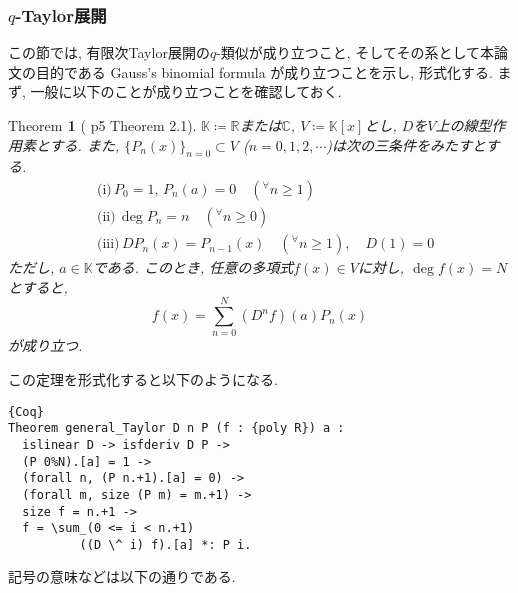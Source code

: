 \documentclass[11pt]{jarticle}
\theoremstyle{mystyle}
\newtheorem{thm}[df]{$\textrm{Theorem}$}
\newcommand{\bthm}{\begin{shadebox} \begin{thm}}
\newcommand{\ethm}{\end{thm} \end{shadebox}}
\newcommand{\bpf}{\begin{proof}}
\newcommand{\epf}{\end{proof}}
\newcommand{\R}{\mathbb{R}}
\newcommand{\C}{\mathbb{C}}
\newcommand{\K}{\mathbb{K}}
\newcommand{\0}{\textbf{0}}
\newcommand{\1}{\textbf{1}}
\newcommand{\2}{\textbf{2}}
\begin{document}
\subsubsection{$q$-Taylor展開} \label{sssec q_Taylor}
この節では, 有限次Taylor展開の$q$-類似が成り立つこと, そしてその系として本論文の目的である Gauss's binomial formula が成り立つことを示し, 形式化する. 
まず, 一般に以下のことが成り立つことを確認しておく. 
\bthm[\cite{Kac} p5 Theorem 2.1] \label{general_Taylor}
$\K\coloneqq\R$または$\C$, $V\coloneqq\K[x]$とし, $D$を$V$上の線型作用素とする. また, 
$\{P_n(x)\}_{n=0}\subset V$ ($n=0,1,2,\cdots$)は次の三条件をみたすとする. 
  \begin{align*}
    &\textrm{(i)}\,P_0 = 1,\,P_n(a)=0 \quad ({}^{\forall}n\ge1)\\
    &\textrm{(ii)}\,\deg P_n = n \quad ({}^{\forall}n\ge0)\\
    &\textrm{(iii)}\,DP_n(x) = P_{n-1}(x) \quad ({}^{\forall}n\ge1), \quad D(1) = 0
  \end{align*}
ただし, $a\in\K$である. このとき, 任意の多項式$f(x)\in V$に対し, $\deg f(x)=N$とすると, 
  \[
    f(x) = \sum_{n=0}^N(D^nf)(a)P_n(x)
  \]
が成り立つ. 
\ethm
この定理を形式化すると以下のようになる. 
\begin{lstlisting}{Coq}
Theorem general_Taylor D n P (f : {poly R}) a :
  islinear D -> isfderiv D P ->
  (P 0%N).[a] = 1 ->
  (forall n, (P n.+1).[a] = 0) ->
  (forall m, size (P m) = m.+1) ->
  size f = n.+1 ->
  f = \sum_(0 <= i < n.+1)
          ((D \^ i) f).[a] *: P i. \end{lstlisting}
記号の意味などは以下の通りである. 
\end{document}
